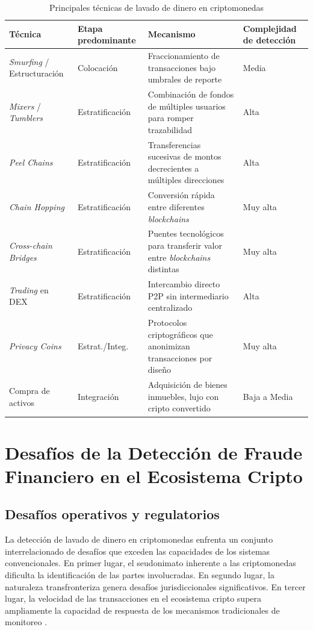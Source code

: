 \begin{table}[t]
    \centering
    \renewcommand{\arraystretch}{1.3}
    \begin{tabular}{|p{3.5cm}|p{2.5cm}|p{5.5cm}|p{2.5cm}|}
    \hline
    \textbf{Técnica} & \textbf{Etapa predominante} & \textbf{Mecanismo} & \textbf{Complejidad de detección} \\
    \hline
    \textit{Smurfing} / Estructuración & Colocación & Fraccionamiento de transacciones bajo umbrales de reporte & Media \\
    \hline
    \textit{Mixers} / \textit{Tumblers} & Estratificación & Combinación de fondos de múltiples usuarios para romper trazabilidad & Alta \\
    \hline
    \textit{Peel Chains} & Estratificación & Transferencias sucesivas de montos decrecientes a múltiples direcciones & Alta \\
    \hline
    \textit{Chain Hopping} & Estratificación & Conversión rápida entre diferentes \textit{blockchains} & Muy alta \\
    \hline
    \textit{Cross-chain Bridges} & Estratificación & Puentes tecnológicos para transferir valor entre \textit{blockchains} distintas & Muy alta \\
    \hline
    \textit{Trading} en DEX & Estratificación & Intercambio directo P2P sin intermediario centralizado & Alta \\
    \hline
    \textit{Privacy Coins} & Estrat./Integ. & Protocolos criptográficos que anonimizan transacciones por diseño & Muy alta \\
    \hline
    Compra de activos & Integración & Adquisición de bienes inmuebles, lujo con cripto convertido & Baja a Media \\
    \hline
    \end{tabular}
    \caption{Principales técnicas de lavado de dinero en criptomonedas}
    \label{tecnicas_lavado}
\end{table}

\section{Desafíos de la Detección de Fraude Financiero en el Ecosistema Cripto}

\subsection{Desafíos operativos y regulatorios}

La detección de lavado de dinero en criptomonedas enfrenta un conjunto interrelacionado de desafíos que exceden las capacidades de los sistemas convencionales. En primer lugar, el seudonimato inherente a las criptomonedas dificulta la identificación de las partes involucradas. En segundo lugar, la naturaleza transfronteriza genera desafíos jurisdiccionales significativos. En tercer lugar, la velocidad de las transacciones en el ecosistema cripto supera ampliamente la capacidad de respuesta de los mecanismos tradicionales de monitoreo \cite{Subashi2024CryptocurrenciesLaundering}.

